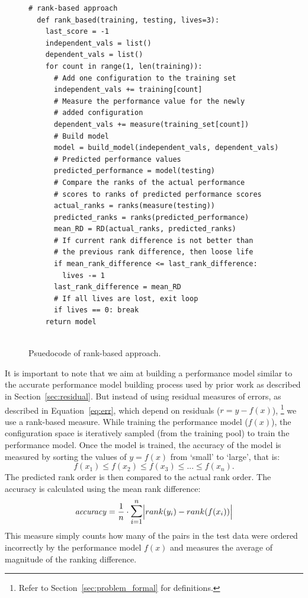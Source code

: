 \documentclass[sigconf]{acmart}
\DeclarePairedDelimiter\abs{\lvert}{\rvert}%
\begin{document}
\begin{figure}[t]
\small
\hspace{0.4cm}\begin{lstlisting}[xrightmargin=5.0ex,mathescape,frame=none,numbers=right]
  # rank-based approach
  def rank_based(training, testing, lives=3): 
    last_score = -1
    independent_vals = list()
    dependent_vals = list()
    for count in range(1, len(training)):    
      # Add one configuration to the training set
      independent_vals += training[count]      
      # Measure the performance value for the newly
      # added configuration 
      dependent_vals += measure(training_set[count])
      # Build model
      model = build_model(independent_vals, dependent_vals)     
      # Predicted performance values
      predicted_performance = model(testing) 
      # Compare the ranks of the actual performance 
      # scores to ranks of predicted performance scores
      actual_ranks = ranks(measure(testing))
      predicted_ranks = ranks(predicted_performance)
      mean_RD = RD(actual_ranks, predicted_ranks)
      # If current rank difference is not better than
      # the previous rank difference, then loose life
      if mean_rank_difference <= last_rank_difference:
        lives -= 1
      last_rank_difference = mean_RD
      # If all lives are lost, exit loop
      if lives == 0: break
    return model
      

\end{lstlisting}
\caption{\small{Psuedocode of rank-based approach.}
}
\label{fig:rank-based}  
\end{figure}
It is important to note that we aim at building a performance model similar to the accurate performance model building process used by prior work as described in Section~\ref{sec:residual}. But instead of using residual measures of errors, as described in Equation~\ref{eq:err}, which depend on residuals ($r = y - f(x)$), \footnote{Refer to Section~\ref{sec:problem_formal} for definitions.} we use a rank-based measure. While training the performance model ($f(x)$), the configuration space is iteratively sampled (from the training pool) to train the performance model. Once the model is trained, the accuracy of the model is measured  by sorting the values of $y=f(x)$ from `small' to `large', that is:
\begin{equation}
    f(x_1) \le f(x_2) \le f(x_3) \le ... \le f(x_n).
\end{equation}
The predicted rank order is then compared to the actual rank order. The accuracy is calculated using the mean rank difference:
\begin{equation} \label{eq:rank_performance}
    \mathit{accuracy} = \frac{1}{n} \cdot \mathlarger{\mathlarger{\sum}}_{i=1}^{n}\abs[\Big]{rank(y_i) - rank(f(x_i))}
\end{equation}
This measure simply counts how many of the pairs in the test data were ordered incorrectly by the performance model $f(x)$ and measures the average of magnitude of the ranking difference. 
\end{document}
